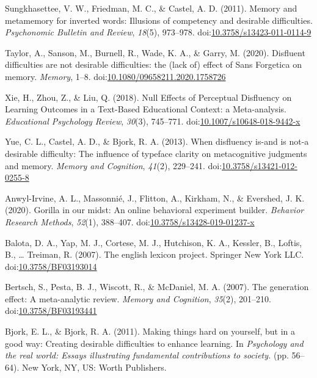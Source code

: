 \documentclass[jou]{apa6}
\begin{document}
\leavevmode\hypertarget{ref-Sungkhasettee2011}{}%
Sungkhasettee, V. W., Friedman, M. C., \& Castel, A. D. (2011). Memory and metamemory for inverted words: Illusions of competency and desirable difficulties. \emph{Psychonomic Bulletin and Review}, \emph{18}(5), 973--978. doi:\href{https://doi.org/10.3758/s13423-011-0114-9}{10.3758/s13423-011-0114-9}

\leavevmode\hypertarget{ref-Taylor2020}{}%
Taylor, A., Sanson, M., Burnell, R., Wade, K. A., \& Garry, M. (2020). Disfluent difficulties are not desirable difficulties: the (lack of) effect of Sans Forgetica on memory. \emph{Memory}, 1--8. doi:\href{https://doi.org/10.1080/09658211.2020.1758726}{10.1080/09658211.2020.1758726}

\leavevmode\hypertarget{ref-Xie2018}{}%
Xie, H., Zhou, Z., \& Liu, Q. (2018). Null Effects of Perceptual Disfluency on Learning Outcomes in a Text-Based Educational Context: a Meta-analysis. \emph{Educational Psychology Review}, \emph{30}(3), 745--771. doi:\href{https://doi.org/10.1007/s10648-018-9442-x}{10.1007/s10648-018-9442-x}

\leavevmode\hypertarget{ref-Yue2013}{}%
Yue, C. L., Castel, A. D., \& Bjork, R. A. (2013). When disfluency is-and is not-a desirable difficulty: The influence of typeface clarity on metacognitive judgments and memory. \emph{Memory and Cognition}, \emph{41}(2), 229--241. doi:\href{https://doi.org/10.3758/s13421-012-0255-8}{10.3758/s13421-012-0255-8}

\leavevmode\hypertarget{ref-Anwyl-Irvine2020}{}%
Anwyl-Irvine, A. L., Massonnié, J., Flitton, A., Kirkham, N., \& Evershed, J. K. (2020). Gorilla in our midst: An online behavioral experiment builder. \emph{Behavior Research Methods}, \emph{52}(1), 388--407. doi:\href{https://doi.org/10.3758/s13428-019-01237-x}{10.3758/s13428-019-01237-x}

\leavevmode\hypertarget{ref-Balota2007}{}%
Balota, D. A., Yap, M. J., Cortese, M. J., Hutchison, K. A., Kessler, B., Loftis, B., \ldots{} Treiman, R. (2007). The english lexicon project. Springer New York LLC. doi:\href{https://doi.org/10.3758/BF03193014}{10.3758/BF03193014}

\leavevmode\hypertarget{ref-Bertsch2007}{}%
Bertsch, S., Pesta, B. J., Wiscott, R., \& McDaniel, M. A. (2007). The generation effect: A meta-analytic review. \emph{Memory and Cognition}, \emph{35}(2), 201--210. doi:\href{https://doi.org/10.3758/BF03193441}{10.3758/BF03193441}

\leavevmode\hypertarget{ref-Bjork2011}{}%
Bjork, E. L., \& Bjork, R. A. (2011). Making things hard on yourself, but in a good way: Creating desirable difficulties to enhance learning. In \emph{Psychology and the real world: Essays illustrating fundamental contributions to society.} (pp. 56--64). New York, NY, US: Worth Publishers.
\end{document}
